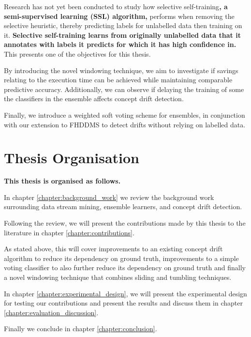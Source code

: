 Research has not yet been conducted to study how selective self-training\textbf{, a semi-supervised learning (SSL) algorithm,} performs when removing the selective heuristic, thereby predicting labels for unlabelled data then training on it. \textbf{Selective self-training learns from originally unlabelled data that it annotates with labels it predicts for which it has high confidence in.} This presents one of the objectives for this thesis.

By introducing the novel windowing technique, we aim to investigate if savings relating to the execution time can be achieved while maintaining comparable predictive accuracy. Additionally, we can observe if delaying the training of some the classifiers in the ensemble affects concept drift detection.

Finally, we introduce a weighted soft voting scheme for ensembles, in conjunction with our extension to FHDDMS to detect drifts without relying on labelled data.


\section{Thesis Organisation}
\textbf{This thesis is organised as follows.}

In chapter \ref{chapter:background_work} we review the background work surrounding data stream mining, ensemble learners, and concept drift detection.

Following the review, we will present the contributions made by this thesis to the literature in chapter \ref{chapter:contributions}.

As stated above, this will cover improvements to an existing concept drift algorithm to reduce its dependency on ground truth, improvements to a simple voting classifier to also further reduce its dependency on ground truth and finally a novel windowing technique that combines sliding and tumbling techniques.

In chapter \ref{chapter:experimental_design}, we will present the experimental design for testing our contributions and present the results and discuss them in chapter \ref{chapter:evaluation_discussion}.

Finally we conclude in chapter \ref{chapter:conclusion}.